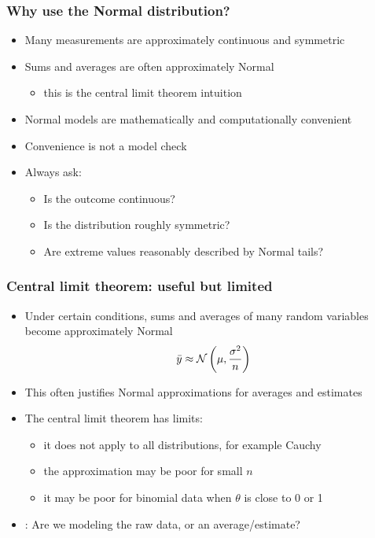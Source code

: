 \documentclass[10pt]{beamer}
\begin{document}
\begin{frame}

  \frametitle{Why use the Normal distribution?}

  \begin{itemize}
  \item Many measurements are approximately continuous and symmetric
  \item Sums and averages are often approximately Normal
  \begin{itemize}
    \item this is the central limit theorem intuition
  \end{itemize}
  \pause
  \item Normal models are mathematically and computationally convenient
  \item Convenience is not a model check
  \pause
  \item Always ask:
  \begin{itemize}
    \item Is the outcome continuous?
    \item Is the distribution roughly symmetric?
    \item Are extreme values reasonably described by Normal tails?
  \end{itemize}
  \end{itemize}

\end{frame}


\begin{frame}

  \frametitle{Central limit theorem: useful but limited}

  \begin{itemize}
  \item Under certain conditions, sums and averages of many random variables
    become approximately Normal
  \[
    \bar{y} \approx \mathcal{N}\left(\mu,\frac{\sigma^2}{n}\right)
  \]
  \pause
  \item This often justifies Normal approximations for averages and estimates
  \pause
  \item The central limit theorem has limits:
  \begin{itemize}
    \item it does not apply to all distributions, for example Cauchy
    \item the approximation may be poor for small $n$
    \item it may be poor for binomial data when $\theta$ is close to 0 or 1
  \end{itemize}
  \pause
  \item {}: Are we modeling the raw data, or an
    average/estimate?
  \end{itemize}

\end{frame}
\end{document}
